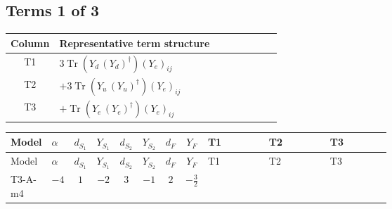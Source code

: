 \documentclass[8pt]{article}
\begin{document}
\begin{landscape}
\subsection*{Terms 1 of 3}
\begin{center}
\begin{tabular}{@{}c >{\raggedright\arraybackslash}p{0.82\linewidth}@{}}
\toprule
Column & Representative term structure \\
\midrule
T1 & \(\displaystyle 3 \operatorname{Tr}\!\left({Y_d}\,\left({Y_d}\right)^{\dagger}\right) \left({Y_e}\right)_{ij}\) \\
\midrule
T2 & \(\displaystyle +3 \operatorname{Tr}\!\left({Y_u}\,\left({Y_u}\right)^{\dagger}\right) \left({Y_e}\right)_{ij}\) \\
\midrule
T3 & \(\displaystyle +\operatorname{Tr}\!\left({Y_e}\,\left({Y_e}\right)^{\dagger}\right) \left({Y_e}\right)_{ij}\) \\
\midrule
\bottomrule
\end{tabular}
\end{center}
\smallskip
\tiny
\begin{longtable}{@{}llcccccc >{\raggedright\arraybackslash}p{0.21\linewidth} >{\raggedright\arraybackslash}p{0.21\linewidth} >{\raggedright\arraybackslash}p{0.21\linewidth}@{}}
\toprule
Model & $\alpha$ & $d_{S_1}$ & $Y_{S_1}$ & $d_{S_2}$ & $Y_{S_2}$ & $d_F$ & $Y_F$ & T1 & T2 & T3 \\
\midrule
\endfirsthead
\toprule
Model & $\alpha$ & $d_{S_1}$ & $Y_{S_1}$ & $d_{S_2}$ & $Y_{S_2}$ & $d_F$ & $Y_F$ & T1 & T2 & T3 \\
\midrule
\endhead
T3-A-m4 & $-4$ & $1$ & $-2$ & $3$ & $-1$ & $2$ & $-\frac{3}{2}$ & \scriptsize\adjustbox{max width=\linewidth}{$\begin{gathered} 3 \operatorname{Tr}\!\left({Y_d}\,\left({Y_d}\right)^{\dagger}\right) \left({Y_e}\right)_{ij}\end{gathered}$} & \scriptsize\adjustbox{max width=\linewidth}{$\begin{gathered} +3 \operatorname{Tr}\!\left({Y_u}\,\left({Y_u}\right)^{\dagger}\right) \left({Y_e}\right)_{ij}\end{gathered}$} & \scriptsize\adjustbox{max width=\linewidth}{$\begin{gathered} +\operatorname{Tr}\!\left({Y_e}\,\left({Y_e}\right)^{\dagger}\right) \left({Y_e}\right)_{ij}\end{gathered}$} \\
\midrule

\end{longtable}
\end{landscape}
\end{document}
